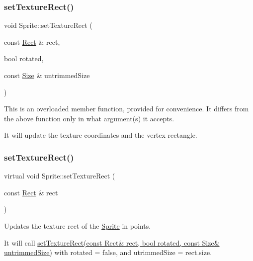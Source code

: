 \subsubsection{\texorpdfstring{set\+Texture\+Rect()}{setTextureRect()}\hspace{0.1cm}{\footnotesize\ttfamily [2/4]}}
{\footnotesize\ttfamily void Sprite\+::set\+Texture\+Rect (\begin{DoxyParamCaption}\item[{const \hyperlink{classRect}{Rect} \&}]{rect,  }\item[{bool}]{rotated,  }\item[{const \hyperlink{classSize}{Size} \&}]{untrimmed\+Size }\end{DoxyParamCaption})\hspace{0.3cm}{\ttfamily [virtual]}}

This is an overloaded member function, provided for convenience. It differs from the above function only in what argument(s) it accepts.

It will update the texture coordinates and the vertex rectangle. \mbox{\label{classSprite_a3a39a4885bd293603b54978d9cbd0088}} 
\subsubsection{\texorpdfstring{set\+Texture\+Rect()}{setTextureRect()}\hspace{0.1cm}{\footnotesize\ttfamily [3/4]}}
{\footnotesize\ttfamily virtual void Sprite\+::set\+Texture\+Rect (\begin{DoxyParamCaption}\item[{const \hyperlink{classRect}{Rect} \&}]{rect }\end{DoxyParamCaption})\hspace{0.3cm}{\ttfamily [virtual]}}

Updates the texture rect of the \hyperlink{classSprite}{Sprite} in points.

It will call \hyperlink{classSprite_ad5cf5f7e651362d5ea7a9635876e464a}{set\+Texture\+Rect(const Rect\& rect, bool rotated, const Size\& untrimmed\+Size)} with {\ttfamily rotated} = false, and {\ttfamily utrimmed\+Size} = rect.\+size. \mbox{\label{classSprite_a53a4ae3eb41e4abef0041181e15e0d60}} 
